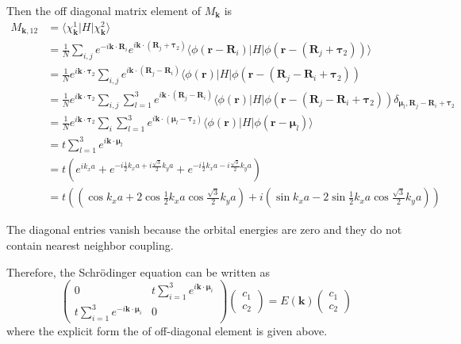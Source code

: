 \documentclass{article}
\begin{document}
Then the off diagonal matrix element of $M_{\mathbf{k}}$ is
\begin{align*}
	M_{\mathbf{k},12}&=\langle\chi_{\mathbf{k}}^1|H|\chi_{\mathbf{k}}^2\rangle\\
	&=\frac{1}{N}\sum_{i,j}e^{-i\mathbf{k}\cdot\mathbf{R}_i}e^{i\mathbf{k}\cdot(\mathbf{R}_j+\bm{\tau}_2)}\langle\phi(\mathbf{r}-\mathbf{R}_i)|H|\phi(\mathbf{r}-(\mathbf{R}_j+\bm{\tau}_2))\rangle\\
	&=\frac{1}{N}e^{i\mathbf{k}\cdot\bm{\tau}_2}\sum_{i,j}e^{i\mathbf{k}\cdot(\mathbf{R}_j-\mathbf{R}_i)}\langle\phi(\mathbf{r})|H|\phi(\mathbf{r}-(\mathbf{R}_j-\mathbf{R}_i+\bm{\tau}_2))\\
	&=\frac{1}{N}e^{i\mathbf{k}\cdot\bm{\tau}_2}\sum_{i,j}\sum_{l=1}^3e^{i\mathbf{k}\cdot(\mathbf{R}_j-\mathbf{R}_i)}\langle\phi(\mathbf{r})|H|\phi(\mathbf{r}-(\mathbf{R}_j-\mathbf{R}_i+\bm{\tau}_2))\delta_{\bm{\mu}_l,\mathbf{R}_j-\mathbf{R}_i+\bm{\tau}_2}\\
	&=\frac{1}{N}e^{i\mathbf{k}\cdot\bm{\tau}_2}\sum_i\sum_{l=1}^3e^{i\mathbf{k}\cdot(\bm{\mu}_l-\bm{\tau}_2)}\langle\phi(\mathbf{r})|H|\phi(\mathbf{r}-\bm{\mu}_l)\rangle\\
	&=t\sum_{l=1}^3e^{i\mathbf{k}\cdot\bm{\mu}_l}\\
	&=t\left(e^{ik_xa}+e^{-i\frac{1}{2}k_xa+i\frac{\sqrt{3}}{2}k_ya}+e^{-i\frac{1}{2}k_xa-i\frac{\sqrt{3}}{2}k_ya}\right)\\
	&=t\left(\left(\cos k_xa+2\cos\frac{1}{2}k_xa\cos\frac{\sqrt{3}}{2}k_ya\right)+i\left(\sin k_xa-2\sin\frac{1}{2}k_xa\cos\frac{\sqrt{3}}{2}k_ya\right)\right)
\end{align*}

The diagonal entries vanish because the orbital energies are zero and they do not contain nearest neighbor coupling.

Therefore, the Schr\"{o}dinger equation can be written as
\begin{equation*}
	\left(\begin{array}{cc}0&t\displaystyle{\sum_{i=1}^3}e^{i\mathbf{k}\cdot\bm{\mu}_i}\\t\displaystyle{\sum_{i=1}^3}e^{-i\mathbf{k}\cdot\bm{\mu}_i}&0\end{array}\right)\left(\begin{array}{c}c_1\\c_2\end{array}\right)=E(\mathbf{k})\left(\begin{array}{c}c_1\\c_2\end{array}\right)
\end{equation*}
where the explicit form the of off-diagonal element is given above.
\end{document}
